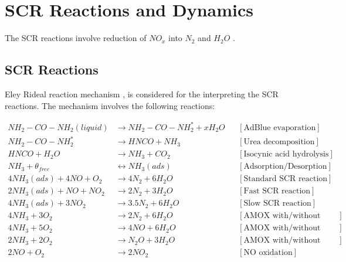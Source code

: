 \section{SCR Reactions and Dynamics}
The SCR reactions involve reduction of $NO_x$ into $N_2$ and $H_2 O$ \cite{jain2023diagnostics}.

\subsection{SCR Reactions}
Eley Rideal reaction mechanism \cite{hsieh2011development}
\cite{yuan2015diesel}, \cite{nova2014urea} is considered for the interpreting
the SCR reactions. The mechanism involves the following reactions:

\begin{align}
    NH_2 - CO - NH_2 (liquid) &\longrightarrow NH_2 - CO - NH_2^* + x H_2 O
                & &[\text{AdBlue evaporation}] \label{eqn::urea_1} \\
    NH_2 - CO - NH_2^*  &\longrightarrow  HNCO + NH_3
                & &[\text{Urea decomposition}] \label{eqn::urea_2}\\
    HNCO + H_2O &\longrightarrow NH_3 + CO_2
                & &[\text{Isocynic acid hydrolysis}] \label{eqn::urea_3}\\
    NH_3 + \theta_{free} &\longleftrightarrow NH_3(ads)
                & &[\text{Adsorption/Desorption}] \label{eqn::ads}\\
    4 NH_3 (ads) + 4 NO + O_2 &\longrightarrow 4 N_2 + 6 H_2O
                              & &[\text{Standard SCR reaction}]
                              \label{eqn::std_scr}\\
    2 NH_3 (ads) +  NO + N O_2 &\longrightarrow 2 N_2 + 3 H_2O
                              & &[\text{Fast SCR reaction}]
                              \label{eqn::fast_scr}\\
    4 NH_3 (ads) + 3N O_2 &\longrightarrow 3.5 N_2 + 6 H_2O
                              & &[\text{Slow SCR reaction}]
                              \label{eqn::slow_scr}\\
    4 NH_3 + 3 O_2 &\longrightarrow 2 N_2 + 6 H_2O
                         & &[\text{AMOX with/without ASC}]
                         \label{eqn::amox_N2}\\
    4 NH_3 + 5 O_2 &\longrightarrow 4 NO + 6 H_2 O
                         & &[\text{AMOX with/without ASC}]
                         \label{eqn::amox_NO}\\
    2 NH_3 + 2 O_2 &\longrightarrow N_2O + 3 H_2O
                         & &[\text{AMOX with/without ASC}]
                         \label{eqn::amox_N20}\\
    2 NO + O_2 &\longrightarrow 2 NO_2
                        & &[\text{NO oxidation}]
                        \label{eqn::NOX}
\end{align}


